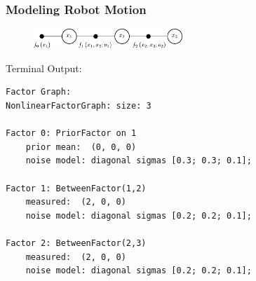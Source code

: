 \begin{frame}[fragile]
    \frametitle{Modeling Robot Motion}



    \scriptsize

    \begin{figure}[!h]
        \includegraphics[width=0.5\textwidth]{./images/gtsam/factor_graph_odometry.pdf}
    \end{figure}

    Terminal Output:
\begin{lstlisting}[style=bash] 
Factor Graph:
NonlinearFactorGraph: size: 3

Factor 0: PriorFactor on 1
    prior mean:  (0, 0, 0)
    noise model: diagonal sigmas [0.3; 0.3; 0.1];

Factor 1: BetweenFactor(1,2)
    measured:  (2, 0, 0)
    noise model: diagonal sigmas [0.2; 0.2; 0.1];

Factor 2: BetweenFactor(2,3)
    measured:  (2, 0, 0)
    noise model: diagonal sigmas [0.2; 0.2; 0.1];
\end{lstlisting}

\end{frame}

